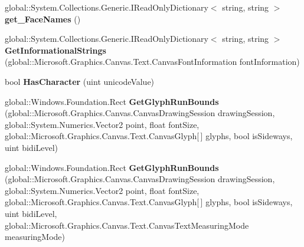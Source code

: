 \begin{DoxyCompactItemize}
\item 
\mbox{\label{interface_microsoft_1_1_graphics_1_1_canvas_1_1_text_1_1_i_canvas_font_face_a48b2ec346abde62b9c208edbedac56c1}} 
global\+::\+System.\+Collections.\+Generic.\+I\+Read\+Only\+Dictionary$<$ string, string $>$ {\bfseries get\+\_\+\+Face\+Names} ()
\item 
\mbox{\label{interface_microsoft_1_1_graphics_1_1_canvas_1_1_text_1_1_i_canvas_font_face_a1a0aad2a6603611b3f19911eb6908380}} 
global\+::\+System.\+Collections.\+Generic.\+I\+Read\+Only\+Dictionary$<$ string, string $>$ {\bfseries Get\+Informational\+Strings} (global\+::\+Microsoft.\+Graphics.\+Canvas.\+Text.\+Canvas\+Font\+Information font\+Information)
\item 
\mbox{\label{interface_microsoft_1_1_graphics_1_1_canvas_1_1_text_1_1_i_canvas_font_face_a5fedc92111007ced9ad11c7f8c3cca05}} 
bool {\bfseries Has\+Character} (uint unicode\+Value)
\item 
\mbox{\label{interface_microsoft_1_1_graphics_1_1_canvas_1_1_text_1_1_i_canvas_font_face_a32cd4710536dd3efe9632f63fb92dec4}} 
global\+::\+Windows.\+Foundation.\+Rect {\bfseries Get\+Glyph\+Run\+Bounds} (global\+::\+Microsoft.\+Graphics.\+Canvas.\+Canvas\+Drawing\+Session drawing\+Session, global\+::\+System.\+Numerics.\+Vector2 point, float font\+Size, global\+::\+Microsoft.\+Graphics.\+Canvas.\+Text.\+Canvas\+Glyph\mbox{[}$\,$\mbox{]} glyphs, bool is\+Sideways, uint bidi\+Level)
\item 
\mbox{\label{interface_microsoft_1_1_graphics_1_1_canvas_1_1_text_1_1_i_canvas_font_face_ab4bcc736bd64c389afff43dc59261d7a}} 
global\+::\+Windows.\+Foundation.\+Rect {\bfseries Get\+Glyph\+Run\+Bounds} (global\+::\+Microsoft.\+Graphics.\+Canvas.\+Canvas\+Drawing\+Session drawing\+Session, global\+::\+System.\+Numerics.\+Vector2 point, float font\+Size, global\+::\+Microsoft.\+Graphics.\+Canvas.\+Text.\+Canvas\+Glyph\mbox{[}$\,$\mbox{]} glyphs, bool is\+Sideways, uint bidi\+Level, global\+::\+Microsoft.\+Graphics.\+Canvas.\+Text.\+Canvas\+Text\+Measuring\+Mode measuring\+Mode)

\end{DoxyCompactItemize}
